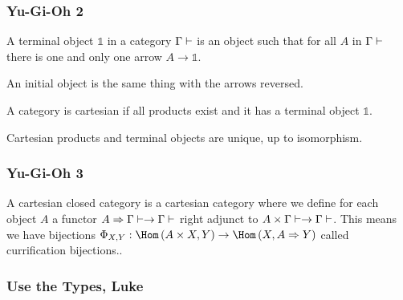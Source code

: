 \documentclass[math, english, info, noamsthm]{beamercours}
\begin{document}
\begin{frame}
	\frametitle{Yu-Gi-Oh 2}
	\begin{definition}
		A terminal object $\mathds{1}$ in a category $\Gamma\vdash$ is an object such that for all $A$ in $\Gamma\vdash$ there is one and only one arrow $A \to \mathds{1}$.
	\end{definition}
	An initial object is the same thing with the arrows reversed.
	\begin{definition}
		A category is cartesian if all products exist and it has a terminal object $\mathds{1}$.
	\end{definition}
	Cartesian products and terminal objects are unique, up to isomorphism.
\end{frame}

\begin{frame}[fragile]
	\frametitle{Yu-Gi-Oh 3}
	\begin{definition}
		A cartesian closed category is a cartesian category where we define for each object $A$ a functor $A \Rightarrow \Gamma\vdash \to \Gamma\vdash$ right adjunct to $A \times \Gamma\vdash \to \Gamma\vdash$.
		This means we have bijections $\Phi_{X, Y}: \Hom\left( A \times X, Y \right) \to \Hom\left( X, A \Rightarrow Y \right)$ called currification bijections..
	\end{definition}
\end{frame}

\begin{frame}
	\frametitle{Use the Types, Luke}
\end{frame}
\end{document}
